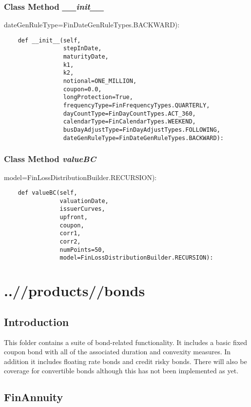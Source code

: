 \documentclass[twoside,11pt]{book}
\begin{document}
\subsection{Class Method {\it \_\_init\_\_}}
dateGenRuleType=FinDateGenRuleTypes.BACKWARD):

\begin{lstlisting}
    def __init__(self,
                 stepInDate,
                 maturityDate,
                 k1,
                 k2,
                 notional=ONE_MILLION,
                 coupon=0.0,
                 longProtection=True,
                 frequencyType=FinFrequencyTypes.QUARTERLY,
                 dayCountType=FinDayCountTypes.ACT_360,
                 calendarType=FinCalendarTypes.WEEKEND,
                 busDayAdjustType=FinDayAdjustTypes.FOLLOWING,
                 dateGenRuleType=FinDateGenRuleTypes.BACKWARD):
\end{lstlisting}

\subsection{Class Method {\it valueBC}}
model=FinLossDistributionBuilder.RECURSION):

\begin{lstlisting}
    def valueBC(self,
                valuationDate,
                issuerCurves,
                upfront,
                coupon,
                corr1,
                corr2,
                numPoints=50,
                model=FinLossDistributionBuilder.RECURSION):
\end{lstlisting}


\chapter{..//products//bonds}
\section{Introduction}
This folder contains a suite of bond-related functionality. It includes a basic fixed coupon bond with all of the associated duration and convexity measures. In addition it includes floating rate bonds and credit risky bonds. There will also be coverage for convertible bonds although this has not been implemented as yet.

\newpage
\section{FinAnnuity}
\end{document}
